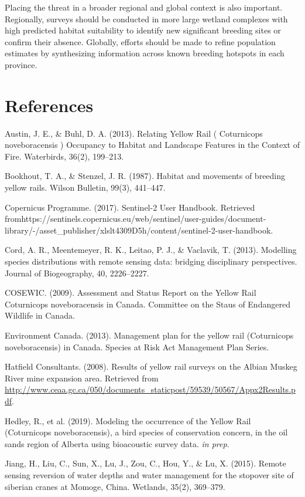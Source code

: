 \documentclass[11pt,]{article}
\begin{document}
Placing the threat in a broader regional and global context is also
important. Regionally, surveys should be conducted in more large wetland
complexes with high predicted habitat suitability to identify new
significant breeding sites or confirm their absence. Globally, efforts
should be made to refine population estimates by synthesizing
information across known breeding hotspots in each province.

\section{References}\label{references}

Austin, J. E., \& Buhl, D. A. (2013). Relating Yellow Rail ( Coturnicops
noveboracensis ) Occupancy to Habitat and Landscape Features in the
Context of Fire. Waterbirds, 36(2), 199--213.

Bookhout, T. A., \& Stenzel, J. R. (1987). Habitat and movements of
breeding yellow rails. Wilson Bulletin, 99(3), 441--447.

Copernicus Programme. (2017). Sentinel-2 User Handbook. Retrieved
fromhttps://sentinels.copernicus.eu/web/sentinel/user-guides/document-library/-/asset\_publisher/xlslt4309D5h/content/sentinel-2-user-handbook.

Cord, A. R., Meentemeyer, R. K., Leitao, P. J., \& Vaclavik, T. (2013).
Modelling species distributions with remote sensing data: bridging
disciplinary perspectives. Journal of Biogeography, 40, 2226--2227.

COSEWIC. (2009). Assessment and Status Report on the Yellow Rail
Coturnicops noveboracensis in Canada. Committee on the Staus of
Endangered Wildlife in Canada.

Environment Canada. (2013). Management plan for the yellow rail
(Coturnicops noveboracensis) in Canada. Species at Risk Act Management
Plan Series.

Hatfield Consultants. (2008). Results of yellow rail surveys on the
Albian Muskeg River mine expansion area. Retrieved from
\url{http://www.ceaa.gc.ca/050/documents_staticpost/59539/50567/Appx2Results.pdf}.

Hedley, R., et al. (2019). Modeling the occurrence of the Yellow Rail
(Coturnicops noveboracensis), a bird species of conservation concern, in
the oil sands region of Alberta using bioacoustic survey data. \emph{in
prep}.

Jiang, H., Liu, C., Sun, X., Lu, J., Zou, C., Hou, Y., \& Lu, X. (2015).
Remote sensing reversion of water depths and water management for the
stopover site of siberian cranes at Momoge, China. Wetlands, 35(2),
369--379.
\end{document}
